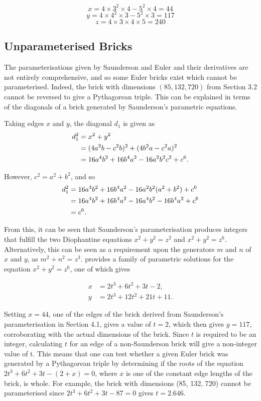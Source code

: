 \documentclass[11pt]{article}
\begin{document}
$$x=4\times{3^2}\times{4}-5^2\times{4}=44$$
$$y=4\times{4^2}\times{3}-5^2\times{3}=117$$
$$z=4\times{3}\times{4}\times{5}=240$$


\subsection{Unparameterised Bricks}
The parameterisations given by Saunderson and Euler and their derivatives are not entirely comprehensive, and so some Euler bricks exist which cannot be parameterised. Indeed, the brick with dimensions $(85, 132, 720)$ from Section 3.2 cannot be reversed to give a Pythagorean triple. This can be explained in terms of the diagonals of a brick generated by Saunderson's parametric equations. 

Taking edges $x$ and $y$, the diagonal $d_1$ is given as
\begin{equation}
\notag
\begin{aligned}
d_1^2&=x^2+y^2\\
&=(4a^2b-c^2b)^2+(4b^2a-c^2a)^2\\
&=16a^4b^2+16b^4a^2-16a^2b^2c^2+c^6.
\end{aligned}
\end{equation}

However, $c^2=a^2+b^2$, and so
\begin{equation}
\notag
\begin{aligned}
d_1^2&=16a^4b^2+16b^4a^2-16a^2b^2(a^2+b^2)+c^6\\
&=16a^4b^2+16b^4a^2-16a^4b^2-16b^4a^2+c^6\\
&=c^6.
\end{aligned}
\end{equation}

From this, it can be seen that Saunderson's parameterisation produces integers that fulfill the two Diophantine equations $x^2+y^2=z^2$ and $x^2+y^2=z^6$. Alternatively, this can be seen as a requirement upon the generators $m$ and $n$ of $x$ and $y$, as $m^2+n^2=z^3$. \cite{mana} provides a family of parametric solutions for the equation $x^2+y^2=z^6$, one of which gives 

\begin{equation*}
\begin{aligned}
x&=2t^3+6t^2+3t-2, \\
y&=2t^3+12t^2+21t+11.
\end{aligned}
\end{equation*}

Setting $x=44$, one of the edges of the brick derived from Saunderson's parameterisation in Section 4.1, gives a value of $t=2$, which then gives $y=117$, corroborating with the actual dimensions of the brick. Since $t$ is required to be an integer, calculating $t$ for an edge of a non-Saunderson brick will give a non-integer value of t. This means that one can test whether a given Euler brick was generated by a Pythagorean triple by determining if the roots of the equation $2t^3+6t^2+3t-(2+x)=0$, where $x$ is one of the constant edge lengths of the brick, is whole.
For example, the brick with dimensions (85, 132, 720) cannot be parameterised since $2t^3+6t^2+3t-87=0$ gives $t=2.646$.
\end{document}

